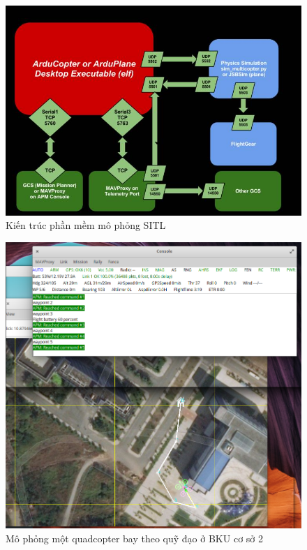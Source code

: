     \begin{figure}[h!]
    	\begin{center}
    		\includegraphics[scale=0.35]{images/ArdupilotSoftwareintheLoopSITL.jpg}
    		\caption{Kiến trúc phần mềm mô phỏng SITL}
    	\end{center}
    \end{figure}
    
    \begin{figure}[h!]
    	\begin{center}
    		\includegraphics[scale=0.45]{images/simulating.png}
    		\caption{Mô phỏng một quadcopter bay theo quỹ đạo ở BKU cơ sở 2}
    	\end{center}
    \end{figure}